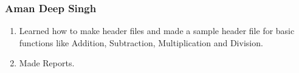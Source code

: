 \documentclass{article}
\begin{document}
\subsubsection*{Aman Deep Singh}
\begin{enumerate}
    \item Learned how to make header files and made a sample header file for basic functions like  Addition, Subtraction, Multiplication and Division.
    \item Made Reports.
\end{enumerate}

\begin{comment}
\section{What we will do}
Convert the C code to CUDA code to be essential in Parallel computing
Create a GUI to make things visual.
Add other forces and their effects in the future.
We are still workin on the basics of CUDA programming and will covert it to CUDA language soon.
Converting the initial code to a function library to ease up the process and debugging
\end{comment}
\end{document}
